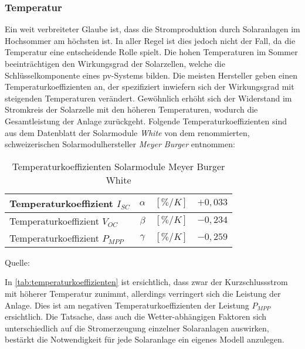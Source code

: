 \documentclass[12pt, a4paper]{article}
\begin{document}
\subsubsection{Temperatur}

Ein weit verbreiteter Glaube ist, dass die Stromproduktion durch Solaranlagen im Hochsommer am höchsten ist. In aller Regel ist dies jedoch nicht der Fall, da die Temperatur eine entscheidende Rolle spielt. Die hohen Temperaturen im Sommer beeinträchtigen den Wirkungsgrad der Solarzellen, welche die Schlüsselkomponente eines \ac{pv}-Systems bilden. Die meisten Hersteller geben einen Temperaturkoeffizienten an, der spezifiziert inwiefern sich der Wirkungsgrad mit steigenden Temperaturen verändert. Gewöhnlich erhöht sich der Widerstand im Stromkreis der Solarzelle mit den höheren Temperaturen, wodurch die Gesamtleistung der Anlage zurückgeht. Folgende Temperaturkoeffizienten sind aus dem Datenblatt der Solarmodule \textit{White} von dem renommierten, schweizerischen Solarmodulhersteller \textit{Meyer Burger} entnommen: \newline


\begin{table}[h]
\begin{center}
\def\arraystretch{1.5}
\setlength\tabcolsep{0.85cm}
\begin{tabular}{| l | c | r | c |}
\hline
Temperaturkoeffizient $I_{SC}$ &	$\alpha$ & 	$[\%/K]$ &		$+0,033$ \\ \hline
Temperaturkoeffizient $V_{OC}$ & 	$\beta$  &	$[\%/K]$ & 		$-0,234$ \\ \hline
Temperaturkoeffizient $P_{MPP}$ & 	$\gamma$  &	$[\%/K]$ & 		$-0,259$ \\ \hline
\end{tabular}
\end{center}

\captionsetup{justification=raggedleft,singlelinecheck=false,skip=-10pt}
\caption*{\scriptsize{Quelle: \cite{meyerburger}}}
\captionsetup{justification=centering,singlelinecheck=false,skip=25pt} 
\caption{Temperaturkoeffizienten Solarmodule Meyer Burger White}
\label{tab:temperaturkoeffizienten} 
\end{table}


In \autoref{tab:temperaturkoeffizienten} ist ersichtlich, dass zwar der Kurzschlussstrom mit höherer Temperatur zunimmt, allerdings verringert sich die Leistung der Anlage. Dies ist am negativen Temperaturkoeffizienten der Leistung $P_{MPP}$ ersichtlich. Die Tatsache, dass auch die Wetter-abhängigen Faktoren sich unterschiedlich auf die Stromerzeugung einzelner Solaranlagen auswirken, bestärkt die Notwendigkeit für jede Solaranlage ein eigenes Modell anzulegen.
\end{document}
